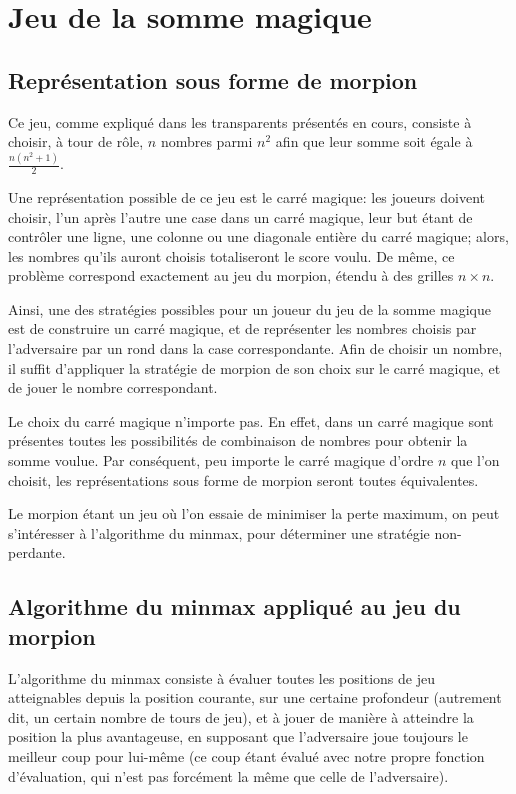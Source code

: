 \section{Jeu de la somme magique}

\subsection{Représentation sous forme de morpion}
Ce jeu, comme expliqué dans les transparents présentés en cours,
consiste à choisir, à tour de rôle, $n$ nombres parmi $n^2$ afin que
leur somme soit égale à $\frac{n(n^2+1)}{2}$.

Une représentation possible de ce jeu est le carré magique: les
joueurs doivent choisir, l'un après l'autre une case dans un carré
magique, leur but étant de contrôler une ligne, une colonne ou une
diagonale entière du carré magique; alors, les nombres qu'ils auront
choisis totaliseront le score voulu. De même, ce problème correspond exactement
au jeu du morpion, étendu à des grilles $n \times n$.

Ainsi, une des stratégies possibles pour un joueur du jeu de la somme
magique est de construire un carré magique, et de représenter les
nombres choisis par l'adversaire par un rond dans la case
correspondante. Afin de choisir un nombre, il suffit d'appliquer la
stratégie de morpion de son choix sur le carré magique, et de
jouer le nombre correspondant.

Le choix du carré magique n'importe pas. En effet, dans un carré
magique sont présentes toutes les possibilités de combinaison de
nombres pour obtenir la somme voulue. Par conséquent, peu importe le
carré magique d'ordre $n$ que l'on choisit, les représentations sous forme de
morpion seront toutes équivalentes.

Le morpion étant un jeu où l'on essaie de minimiser la perte maximum,
on peut s'intéresser à l'algorithme du minmax, pour déterminer une
stratégie non-perdante.

\subsection{Algorithme du minmax appliqué au jeu du morpion}
L'algorithme du minmax consiste à évaluer toutes les positions de jeu
atteignables depuis la position courante, sur une certaine profondeur
(autrement dit, un certain nombre de tours de jeu), et à jouer de
manière à atteindre la position la plus avantageuse, en supposant que
l'adversaire joue toujours le meilleur coup pour lui-même (ce coup
étant évalué avec notre propre fonction d'évaluation, qui n'est pas
forcément la même que celle de l'adversaire).

